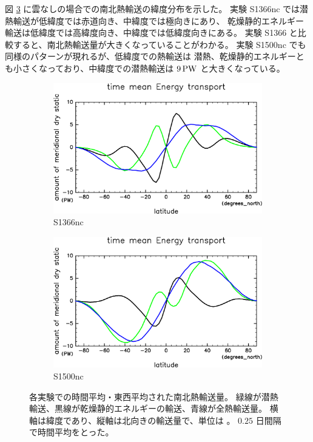\documentclass[body]{subfiles}
\begin{document}
\afterpage{\clearpage}

図 \ref{EnFlxnc} に雲なしの場合での南北熱輸送の緯度分布を示した。
実験 S1366nc では潜熱輸送が低緯度では赤道向き、中緯度では極向きにあり、
乾燥静的エネルギー輸送は低緯度では高緯度向き、中緯度では低緯度向きにある。
実験 S1366 と比較すると、南北熱輸送量が大きくなっていることがわかる。
実験 S1500nc でも同様のパターンが現れるが、低緯度での熱輸送は
潜熱、乾燥静的エネルギーとも小さくなっており、中緯度での潜熱輸送は
\(9\hmu{PW}\) と大きくなっている。

\begin{figure}[t]
	\centering
	\begin{subfigure}{.4\textwidth}
		\centering
		\includegraphics[width=\textwidth]{S1366-nc/EngyFlx,time=3650:4015-crop-rotate.pdf}
		\caption{S1366nc}\label{EnFlxS1366nc}
	\end{subfigure}
	\begin{subfigure}{.4\textwidth}
		\centering
		\includegraphics[width=\textwidth]{S1500-nc/EngyFlx,time=3650:4015-crop-rotate.pdf}
		\caption{S1500nc}\label{EnFlxS1500nc}
	\end{subfigure}
	\caption[各実験での南北熱輸送量]{
		各実験での時間平均・東西平均された南北熱輸送量。
		緑線が潜熱輸送、黒線が乾燥静的エネルギーの輸送、青線が全熱輸送量。
		横軸は緯度であり、縦軸は北向きの輸送量で、単位は 。
		\(0.25\) 日間隔で時間平均をとった。
	}\label{EnFlxnc}
\end{figure}
\end{document}
